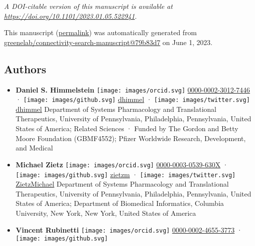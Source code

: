 \emph{A DOI-citable version of this manuscript is available at \url{https://doi.org/10.1101/2023.01.05.522941}}.

This manuscript
(\href{https://greenelab.github.io/connectivity-search-manuscript/v/79b83d77cd74c8914bba55bf1beeb99ace4c9d2a/}{permalink})
was automatically generated
from \href{https://github.com/greenelab/connectivity-search-manuscript/tree/79b83d77cd74c8914bba55bf1beeb99ace4c9d2a}{greenelab/connectivity-search-manuscript@79b83d7}
on June 1, 2023.

\hypertarget{authors}{%
\subsection{Authors}\label{authors}}

\begin{itemize}
\item
  \textbf{Daniel S. Himmelstein}
  \texttt{[image: images/orcid.svg]}
  \href{https://orcid.org/0000-0002-3012-7446}{0000-0002-3012-7446}
  · \texttt{[image: images/github.svg]}
  \href{https://github.com/dhimmel}{dhimmel}
  · \texttt{[image: images/twitter.svg]}
  \href{https://twitter.com/dhimmel}{dhimmel}
  Department of Systems Pharmacology and Translational Therapeutics, University of Pennsylvania, Philadelphia, Pennsylvania, United States of America; Related Sciences
  · Funded by The Gordon and Betty Moore Foundation (GBMF4552); Pfizer Worldwide Research, Development, and Medical
\item
  \textbf{Michael Zietz}
  \texttt{[image: images/orcid.svg]}
  \href{https://orcid.org/0000-0003-0539-630X}{0000-0003-0539-630X}
  · \texttt{[image: images/github.svg]}
  \href{https://github.com/zietzm}{zietzm}
  · \texttt{[image: images/twitter.svg]}
  \href{https://twitter.com/ZietzMichael}{ZietzMichael}
  Department of Systems Pharmacology and Translational Therapeutics, University of Pennsylvania, Philadelphia, Pennsylvania, United States of America; Department of Biomedical Informatics, Columbia University, New York, New York, United States of America
\item
  \textbf{Vincent Rubinetti}
  \texttt{[image: images/orcid.svg]}
  \href{https://orcid.org/0000-0002-4655-3773}{0000-0002-4655-3773}
  · \texttt{[image: images/github.svg]}

\end{itemize}
